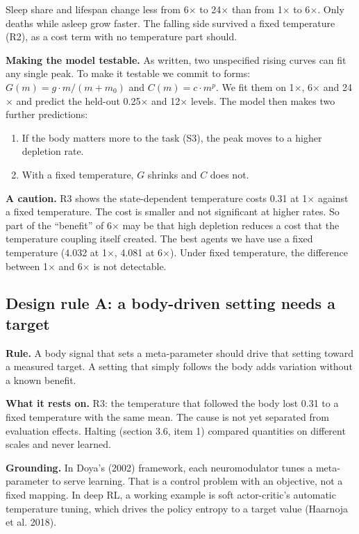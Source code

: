 \documentclass[11pt]{article}
\begin{document}
Sleep share and lifespan change less from 6$\times$ to 24$\times$ than from 1$\times$ to 6$\times$. Only deaths while asleep grow faster. The falling side survived a fixed temperature (R2), as a cost term with no temperature part should.

\textbf{Making the model testable.} As written, two unspecified rising curves can fit any single peak. To make it testable we commit to forms: $G(m) = g \cdot m/(m + m_0)$ and $C(m) = c \cdot m^p$. We fit them on 1$\times$, 6$\times$ and 24$\times$ and predict the held-out 0.25$\times$ and 12$\times$ levels. The model then makes two further predictions:

\begin{enumerate}
\item If the body matters more to the task (S3), the peak moves to a higher depletion rate.
\item With a fixed temperature, $G$ shrinks and $C$ does not.
\end{enumerate}

\textbf{A caution.} R3 shows the state-dependent temperature costs 0.31 at 1$\times$ against a fixed temperature. The cost is smaller and not significant at higher rates. So part of the ``benefit'' of 6$\times$ may be that high depletion reduces a cost that the temperature coupling itself created. The best agents we have use a fixed temperature (4.032 at 1$\times$, 4.081 at 6$\times$). Under fixed temperature, the difference between 1$\times$ and 6$\times$ is not detectable.

\subsection{Design rule A: a body-driven setting needs a target}

\textbf{Rule.} A body signal that sets a meta-parameter should drive that setting toward a measured target. A setting that simply follows the body adds variation without a known benefit.

\textbf{What it rests on.} R3: the temperature that followed the body lost 0.31 to a fixed temperature with the same mean. The cause is not yet separated from evaluation effects. Halting (section 3.6, item 1) compared quantities on different scales and never learned.

\textbf{Grounding.} In Doya's (2002) framework, each neuromodulator tunes a meta-parameter to serve learning. That is a control problem with an objective, not a fixed mapping. In deep RL, a working example is soft actor-critic's automatic temperature tuning, which drives the policy entropy to a target value (Haarnoja et al. 2018).
\end{document}

